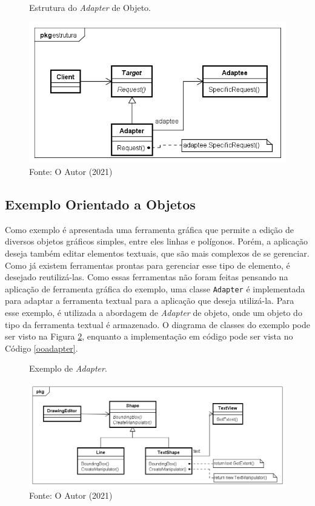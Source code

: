 \begin{figure}[htb]
	\caption{\label{adapter_alt_struct}Estrutura do \textit{Adapter} de Objeto.}
	\begin{center}
	    \includegraphics[scale=0.5]{5_padroes-contexto-funcional/5.2_estruturais/5.2.1_adapter/adapter_objeto_estrutura.png}
	\end{center}
  \caption*{Fonte: O Autor (2021)}
\end{figure}

\subsection*{Exemplo Orientado a Objetos}

Como exemplo é apresentada uma ferramenta gráfica 
que permite a edição de diversos objetos gráficos 
simples, entre eles linhas e polígonos. Porém, 
a aplicação deseja também editar elementos textuais, 
que são mais complexos de se gerenciar. Como já existem 
ferramentas prontas para gerenciar esse tipo de 
elemento, é desejado reutilizá-las. Como essas 
ferramentas não foram feitas pensando na 
aplicação de ferramenta gráfica do exemplo, uma 
classe \texttt{Adapter} é implementada para adaptar a 
ferramenta textual para a aplicação que deseja 
utilizá-la. Para esse exemplo, é utilizada a 
abordagem de \textit{Adapter} de objeto, onde um objeto 
do tipo da ferramenta textual é armazenado. O 
diagrama de classes do exemplo pode ser visto na 
Figura \ref{adapter_exemplo}, enquanto a 
implementação em código pode ser vista no Código 
\ref{ooadapter}.


\begin{figure}[htb]
	\caption{\label{adapter_exemplo}Exemplo de \textit{Adapter}.}
	\begin{center}
	    \includegraphics[scale=0.5]{5_padroes-contexto-funcional/5.2_estruturais/5.2.1_adapter/adapter_exemplo.png}
	\end{center}
  \caption*{Fonte: O Autor (2021)}
\end{figure}


